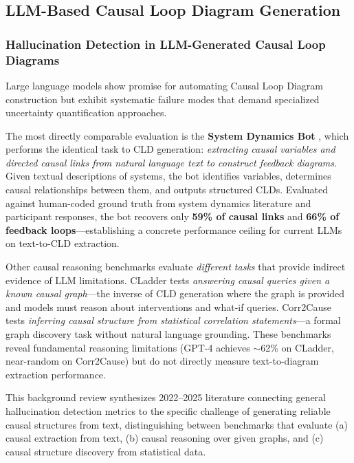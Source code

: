
\subsection{LLM-Based Causal Loop Diagram Generation}
\label{sec:lit_cld_generation}

\subsubsection{Hallucination Detection in LLM-Generated Causal Loop Diagrams}

Large language models show promise for automating Causal Loop Diagram construction but exhibit systematic failure modes that demand specialized uncertainty quantification approaches. 

The most directly comparable evaluation is the \textbf{System Dynamics Bot} \citep{hosseinichimeh2024textmapdynamicsbot}, which performs the identical task to CLD generation: \textit{extracting causal variables and directed causal links from natural language text to construct feedback diagrams}. Given textual descriptions of systems, the bot identifies variables, determines causal relationships between them, and outputs structured CLDs. Evaluated against human-coded ground truth from system dynamics literature and participant responses, the bot recovers only \textbf{59\% of causal links} and \textbf{66\% of feedback loops}---establishing a concrete performance ceiling for current LLMs on text-to-CLD extraction.

Other causal reasoning benchmarks evaluate \textit{different tasks} that provide indirect evidence of LLM limitations. CLadder \citep{jin2023cladder} tests \textit{answering causal queries given a known causal graph}---the inverse of CLD generation where the graph is provided and models must reason about interventions and what-if queries. Corr2Cause tests \textit{inferring causal structure from statistical correlation statements}---a formal graph discovery task without natural language grounding. These benchmarks reveal fundamental reasoning limitations (GPT-4 achieves $\sim$62\% on CLadder, near-random on Corr2Cause) but do not directly measure text-to-diagram extraction performance.

This background review synthesizes 2022--2025 literature connecting general hallucination detection metrics to the specific challenge of generating reliable causal structures from text, distinguishing between benchmarks that evaluate (a) causal extraction from text, (b) causal reasoning over given graphs, and (c) causal structure discovery from statistical data.

